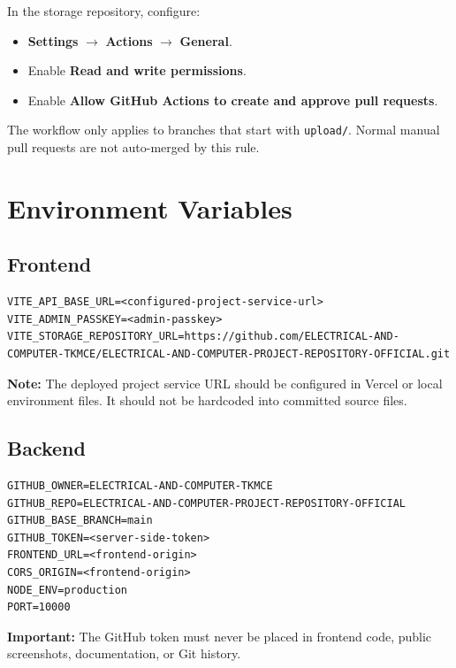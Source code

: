 \documentclass[12pt,a4paper]{article}
\begin{document}
In the storage repository, configure:

\begin{itemize}[leftmargin=*]
    \item \textbf{Settings} $\rightarrow$ \textbf{Actions} $\rightarrow$ \textbf{General}.
    \item Enable \textbf{Read and write permissions}.
    \item Enable \textbf{Allow GitHub Actions to create and approve pull requests}.
\end{itemize}

The workflow only applies to branches that start with \texttt{upload/}. Normal manual pull requests are not auto-merged by this rule.

\section{Environment Variables}

\subsection{Frontend}

\begin{lstlisting}
VITE_API_BASE_URL=<configured-project-service-url>
VITE_ADMIN_PASSKEY=<admin-passkey>
VITE_STORAGE_REPOSITORY_URL=https://github.com/ELECTRICAL-AND-COMPUTER-TKMCE/ELECTRICAL-AND-COMPUTER-PROJECT-REPOSITORY-OFFICIAL.git
\end{lstlisting}

\textbf{Note:} The deployed project service URL should be configured in Vercel or local environment files. It should not be hardcoded into committed source files.

\subsection{Backend}

\begin{lstlisting}
GITHUB_OWNER=ELECTRICAL-AND-COMPUTER-TKMCE
GITHUB_REPO=ELECTRICAL-AND-COMPUTER-PROJECT-REPOSITORY-OFFICIAL
GITHUB_BASE_BRANCH=main
GITHUB_TOKEN=<server-side-token>
FRONTEND_URL=<frontend-origin>
CORS_ORIGIN=<frontend-origin>
NODE_ENV=production
PORT=10000
\end{lstlisting}

\textbf{Important:} The GitHub token must never be placed in frontend code, public screenshots, documentation, or Git history.
\end{document}
